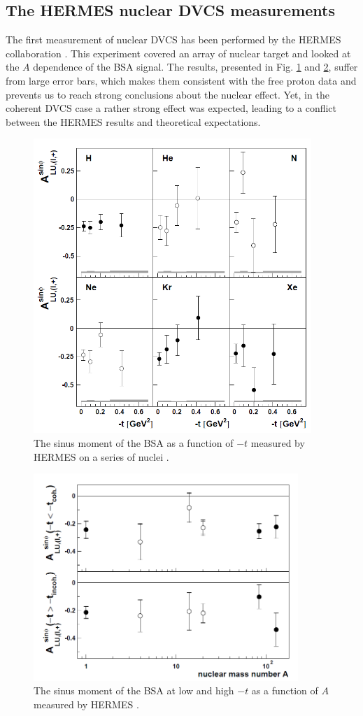 \documentclass[aps,prc,preprint,superscriptaddress]{revtex4}
\begin{document}
\subsection{The HERMES nuclear DVCS measurements}

The first measurement of nuclear DVCS has been performed by the HERMES collaboration 
\cite{Airapetian:2009cga}.
This experiment covered an array of nuclear target and looked at the $A$ dependence of the
BSA signal. The results, presented in Fig. \ref{fig:HERMES1} and \ref{fig:HERMES2}, suffer
from large error bars, which makes them consistent with the free proton data and prevents us to
reach strong conclusions about the nuclear effect. Yet, in the coherent DVCS case a rather
strong effect was expected, leading to a conflict between the HERMES results and theoretical
expectations. 

\begin{figure}[tbp!]
\center
	\includegraphics[width=10.5cm]{fig3/HERMES_BSA.png}
	\caption{The sinus moment of the BSA as a function of $-t$ measured by HERMES
	on a series of nuclei \cite{Airapetian:2009cga}.}
\label{fig:HERMES1}
\end{figure}

\begin{figure}[tbp!]
\center
\includegraphics[width=10cm]{fig3/HERMES_BSA_2.png}
\caption{The sinus moment of the BSA at low and high $-t$ as a function of $A$ measured by HERMES
	\cite{Airapetian:2009cga}.}
\label{fig:HERMES2}
\end{figure}
\end{document}
